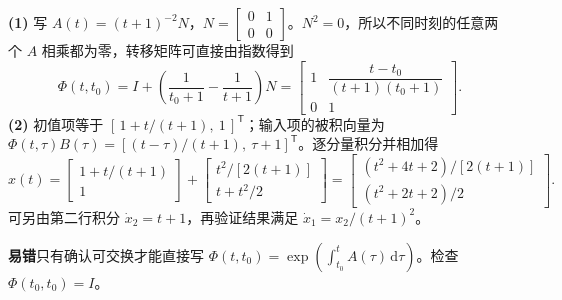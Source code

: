 

\sol \textbf{(1)} 写 $A(t)=(t+1)^{-2}N$，$N=\begin{bmatrix}0&1\\0&0\end{bmatrix}$。$N^2=0$，所以不同时刻的任意两个 $A$ 相乘都为零，转移矩阵可直接由指数得到
\[
\Phi(t,t_0)=I+\left(\frac{1}{t_0+1}-\frac{1}{t+1}\right)N
=\begin{bmatrix}
1 & \dfrac{t-t_0}{(t+1)(t_0+1)}\\
0 & 1
\end{bmatrix}.
\]
\textbf{(2)} 初值项等于 $[\,1+t/(t+1),\ 1\,]^{\mathsf T}$；输入项的被积向量为 $\Phi(t,\tau)B(\tau)=[(t-\tau)/(t+1),\ \tau+1]^{\mathsf T}$。逐分量积分并相加得
\[
x(t)=
\begin{bmatrix}1+t/(t+1)\\1\end{bmatrix}+
\begin{bmatrix}t^2/[2(t+1)]\\t+t^2/2\end{bmatrix}
=
\begin{bmatrix}(t^2+4t+2)/[2(t+1)]\\(t^2+2t+2)/2\end{bmatrix}.
\]
可另由第二行积分 $\dot x_2=t+1$，再验证结果满足 $\dot x_1=x_2/(t+1)^2$。

\noindent\textbf{易错}\quad 只有确认可交换才能直接写 $\Phi(t,t_0)=\exp(\int_{t_0}^{t}A(\tau)\,\mathrm d\tau)$。检查 $\Phi(t_0,t_0)=I$。
